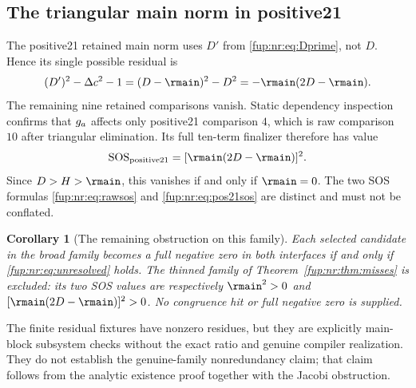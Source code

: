 \documentclass[11pt,letterpaper]{article}
\newtheorem{corollary}[theorem]{Corollary}
\theoremstyle{definition}\newtheorem{definition}[theorem]{Definition}
\theoremstyle{remark}\newtheorem{remark}[theorem]{Remark}
\begin{document}
\subsection{The triangular main norm in positive21}
The positive21 retained main norm uses $D'$ from \eqref{fup:nr:eq:Dprime}, not $D$. Hence its single possible residual is
\begin{equation}\label{fup:nr:eq:positive21res}
 (D')^2-\Delta c^2-1
 =(D-\rmain)^2-D^2=-\rmain(2D-\rmain).
\end{equation}
The remaining nine retained comparisons vanish. Static dependency inspection confirms that $g_a$ affects only positive21 comparison $4$, which is raw comparison $10$ after triangular elimination. Its full ten-term finalizer therefore has value
\begin{equation}\label{fup:nr:eq:pos21sos}
 \operatorname{SOS}_{\mathrm{positive21}}=
 [\rmain(2D-\rmain)]^2.
\end{equation}
Since $D>H>\rmain$, this vanishes if and only if $\rmain=0$. The two SOS formulas \eqref{fup:nr:eq:rawsos} and \eqref{fup:nr:eq:pos21sos} are distinct and must not be conflated.

\begin{corollary}[The remaining obstruction on this family]
Each selected candidate in the broad family becomes a full negative zero in both interfaces if and only if \eqref{fup:nr:eq:unresolved} holds. The thinned family of Theorem~\ref{fup:nr:thm:misses} is excluded: its two SOS values are respectively $\rmain^2>0$ and $[\rmain(2D-\rmain)]^2>0$. No congruence hit or full negative zero is supplied.
\end{corollary}
The finite residual fixtures have nonzero residues, but they are explicitly main-block subsystem checks without the exact ratio and genuine compiler realization. They do not establish the genuine-family nonredundancy claim; that claim follows from the analytic existence proof together with the Jacobi obstruction.
\end{document}
